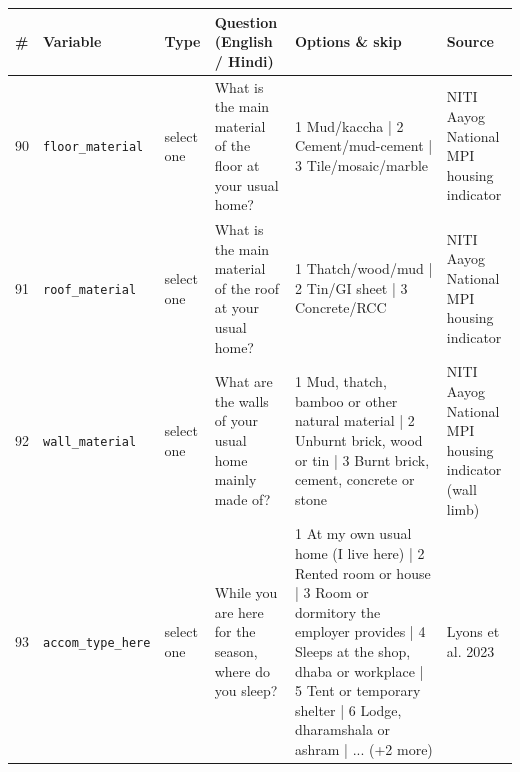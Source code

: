 \documentclass[9pt,a4paper,landscape]{article}
\begin{document}
\begin{longtable}{@{}p{0.5cm}p{3.3cm}p{1.7cm}p{7.3cm}p{5.6cm}p{5.4cm}@{}}
\toprule \footnotesize\textbf{\#} & \footnotesize\textbf{Variable} & \footnotesize\textbf{Type} & \footnotesize\textbf{Question (English / Hindi)} & \footnotesize\textbf{Options {\&} skip} & \footnotesize\textbf{Source}\\ \midrule
\endhead
\footnotesize 90 & \footnotesize\texttt{floor\_material} & \scriptsize select one & \footnotesize What is the main material of the floor at your usual home?\par\vspace{1pt}{\footnotesize\color{hdr}{\hifont आपके असली घर में फ़र्श मुख्य रूप से किस चीज़ का है?}} & \scriptsize 1 Mud/kaccha | 2 Cement/mud-cement | 3 Tile/mosaic/marble & \scriptsize NITI Aayog National MPI housing indicator\\
\footnotesize 91 & \footnotesize\texttt{roof\_material} & \scriptsize select one & \footnotesize What is the main material of the roof at your usual home?\par\vspace{1pt}{\footnotesize\color{hdr}{\hifont आपके असली घर की छत मुख्य रूप से किस चीज़ की है?}} & \scriptsize 1 Thatch/wood/mud | 2 Tin/GI sheet | 3 Concrete/RCC & \scriptsize NITI Aayog National MPI housing indicator\\
\footnotesize 92 & \footnotesize\texttt{wall\_material} & \scriptsize select one & \footnotesize What are the walls of your usual home mainly made of?\par\vspace{1pt}{\footnotesize\color{hdr}{\hifont आपके असली घर की दीवारें मुख्य रूप से किस चीज़ की बनी हैं?}} & \scriptsize 1 Mud, thatch, bamboo or other natural material | 2 Unburnt brick, wood or tin | 3 Burnt brick, cement, concrete or stone & \scriptsize NITI Aayog National MPI housing indicator (wall limb)\\
\footnotesize 93 & \footnotesize\texttt{accom\_type\_here} & \scriptsize select one & \footnotesize While you are here for the season, where do you sleep?\par\vspace{1pt}{\footnotesize\color{hdr}{\hifont सीज़न में यहाँ रहते हुए आप कहाँ सोते हैं?}} & \scriptsize 1 At my own usual home (I live here) | 2 Rented room or house | 3 Room or dormitory the employer provides | 4 Sleeps at the shop, dhaba or workplace | 5 Tent or temporary shelter | 6 Lodge, dharamshala or ashram | ... (+2 more) & \scriptsize Lyons et al. 2023\\

\end{longtable}
\end{document}
